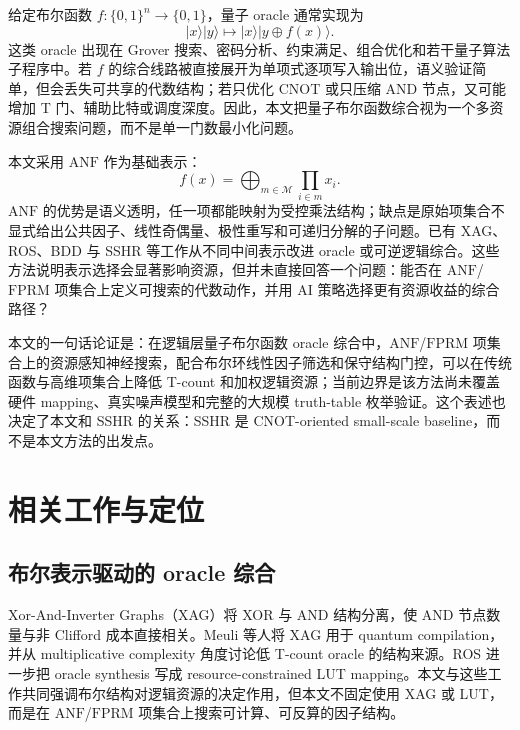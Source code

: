 \documentclass[UTF8,fontset=macnew,11pt]{ctexart}
\newcommand{\anf}{\ensuremath{\mathrm{ANF}}}
\newcommand{\fprm}{\ensuremath{\mathrm{FPRM}}}
\newcommand{\xor}{\ensuremath{\oplus}}
\newcommand{\ttable}{truth-table}
\begin{document}
给定布尔函数 $f:\{0,1\}^n\rightarrow\{0,1\}$，量子 oracle 通常实现为
\begin{equation}
  |x\rangle |y\rangle \mapsto |x\rangle |y\xor f(x)\rangle .
  \label{eq:oracle}
\end{equation}
这类 oracle 出现在 Grover 搜索、密码分析、约束满足、组合优化和若干量子算法子程序中。若 $f$ 的综合线路被直接展开为单项式逐项写入输出位，语义验证简单，但会丢失可共享的代数结构；若只优化 CNOT 或只压缩 AND 节点，又可能增加 T 门、辅助比特或调度深度。因此，本文把量子布尔函数综合视为一个多资源组合搜索问题，而不是单一门数最小化问题。

本文采用 \anf{} 作为基础表示：
\begin{equation}
  f(x)=\bigoplus_{m\in\mathcal{M}}\prod_{i\in m}x_i .
  \label{eq:anf}
\end{equation}
\anf{} 的优势是语义透明，任一项都能映射为受控乘法结构；缺点是原始项集合不显式给出公共因子、线性奇偶量、极性重写和可递归分解的子问题。已有 XAG、ROS、BDD 与 SSHR 等工作从不同中间表示改进 oracle 或可逆逻辑综合\cite{meuli2022xag,meuli2020ros,wille2009bdd,zheng2025sshr}。这些方法说明表示选择会显著影响资源，但并未直接回答一个问题：能否在 \anf{}/\fprm{} 项集合上定义可搜索的代数动作，并用 AI 策略选择更有资源收益的综合路径？

本文的一句话论证是：在逻辑层量子布尔函数 oracle 综合中，\anf{}/\fprm{} 项集合上的资源感知神经搜索，配合布尔环线性因子筛选和保守结构门控，可以在传统函数与高维项集合上降低 T-count 和加权逻辑资源；当前边界是该方法尚未覆盖硬件 mapping、真实噪声模型和完整的大规模 \ttable{} 枚举验证。这个表述也决定了本文和 SSHR 的关系：SSHR 是 CNOT-oriented small-scale baseline，而不是本文方法的出发点。

\section{相关工作与定位}

\subsection{布尔表示驱动的 oracle 综合}

Xor-And-Inverter Graphs（XAG）将 XOR 与 AND 结构分离，使 AND 节点数量与非 Clifford 成本直接相关。Meuli 等人将 XAG 用于 quantum compilation\cite{meuli2022xag}，并从 multiplicative complexity 角度讨论低 T-count oracle 的结构来源\cite{meuli2019multiplicative}。ROS 进一步把 oracle synthesis 写成 resource-constrained LUT mapping\cite{meuli2020ros}。本文与这些工作共同强调布尔结构对逻辑资源的决定作用，但本文不固定使用 XAG 或 LUT，而是在 \anf{}/\fprm{} 项集合上搜索可计算、可反算的因子结构。
\end{document}
